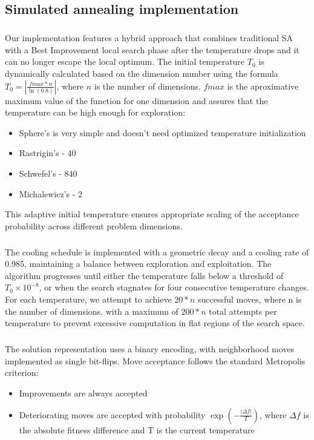 \documentclass{article}
\begin{document}
\subsection{Simulated annealing implementation}

\subparagraph{}
Our implementation features a hybrid approach that combines traditional SA with a Best Improvement local search phase after the temperature drops and it can no longer escape the local optimum. The initial temperature $T_0$ is dynamically calculated based on the dimension number using the formula $T_0 = \left|\frac{fmax*n}{\ln(0.8)}\right|$, where $n$ is the number of dimensions. $fmax$ is the aproximative maximum value of the function for one dimension and assures that the temperature can be high enough for exploration:
\begin{itemize} 
    \item Sphere's is very simple and doesn't need optimized temperature initialization
    \item Rastrigin's - 40 
    \item Schwefel's - 840 
    \item Michalewicz's - 2 
\end{itemize} 
This adaptive initial temperature ensures appropriate scaling of the acceptance probability across different problem dimensions. 

\subparagraph{}
The cooling schedule is implemented with a geometric decay and a cooling rate of 0.985, maintaining a balance between exploration and exploitation. The algorithm progresses until either the temperature falls below a threshold of $T_0\times10^{-8}$, or when the search stagnates for four consecutive temperature changes. For each temperature, we attempt to achieve $20*n$ successful moves, where n is the number of dimensions, with a maximum of $200*n$ total attempts per temperature to prevent excessive computation in flat regions of the search space. 

\subparagraph{}
The solution representation uses a binary encoding, with neighborhood moves implemented as single bit-flips. Move acceptance follows the standard Metropolis criterion:
\begin{itemize}
    \item Improvements are always accepted
    \item Deteriorating moves are accepted with probability $\exp\left(-\frac{| \Delta f |}{T}\right)$, where $\Delta f$ is the absolute fitness difference and T is the current temperature
\end{itemize}
\end{document}
